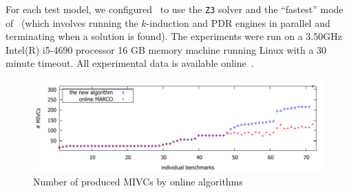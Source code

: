 For each test model, we configured \jkind\ to use the \texttt{Z3} solver and the ``fastest'' mode of \jkind\ (which involves running the $k$-induction and PDR engines in parallel and terminating when a solution is found). The experiments were run on a  3.50GHz  Intel(R) i5-4690 processor 16 GB memory machine running Linux with a 30 minute timeout.  All experimental data is available online~\cite{expr}.


\begin{figure}[!t]
\centering
\includegraphics[scale=0.8]{./plots/found_mivcs.pdf}
\caption{Number of produced MIVCs by online algorithms}
\label{res:found_mivcs}
\end{figure}

